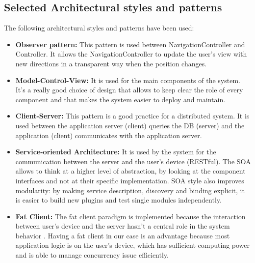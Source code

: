 \clearpage
\subsection{Selected Architectural styles and patterns}
The following architectural styles and patterns have been used:
\begin{itemize}
\item
\textbf{Observer pattern:} This pattern is used between NavigationController and Controller. It allows the NavigationController to update the user’s view with new directions in a transparent way when the position changes.
\item
\textbf{Model-Control-View:} It is used for the main components of the system. It’s a really good choice of design that allows to keep clear the role of every component and that makes the system easier to deploy and maintain.
\item
\textbf{Client-Server:} This pattern is a good practice for a distributed system. It is used between the application server (client) queries the DB (server) and the application (client) communicates with the application server.
\item
\textbf{Service-oriented Architecture:} It is used by the system for the communication between the server and the user’s device (RESTful). The SOA allows to think at a higher level of abstraction, by looking at the component interfaces and not at their specific implementation. SOA style also improves modularity: by making service description, discovery and binding explicit, it is easier to build new plugins and test single modules independently.
\item
\textbf{Fat Client:} The fat client paradigm is implemented because the interaction between user’s device and the server hasn’t a central role in the system behavior . Having a fat client in our case is an advantage because most application logic is on the user’s device, which has sufficient computing power and is able to manage concurrency issue efficiently.
\end{itemize}